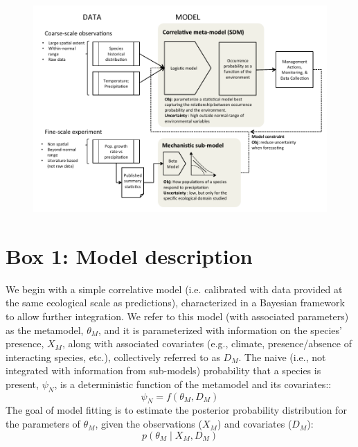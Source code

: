 \documentclass[11pt]{article}
\begin{document}
\newpage
\begin{figure}[h!]
	\includegraphics{management.pdf}
	\caption{}
	\label{fig:management}
\end{figure}


%
%


\newpage
\linenumbers
\section*{Box 1: Model description}
We begin with a simple correlative model (i.e. calibrated with data provided at the same ecological scale as predictions), characterized in a Bayesian framework to allow further integration. 
We refer to this model (with associated parameters) as the metamodel, \(\theta_M\), and it is parameterized with information on the species' presence, \(X_M\), along with associated covariates (e.g., climate, presence/absence of interacting species, etc.), collectively referred to as \(D_M\). 
The naive (i.e., not integrated with information from sub-models) probability that a species is present, \(\psi_N\), is a deterministic function of the metamodel and its covariates::
\begin{equation}
\label{eq:sdm1}
	\psi_N = f(\theta_M, D_M)
\end{equation}
The goal of model fitting is to estimate the posterior probability distribution for the parameters of \(\theta_M\), given the observations (\(X_M\)) and covariates (\(D_M\)):
\begin{equation}
\label{eq:sdm2}
	p( \theta_M \mid X_M, D_M)
\end{equation}
\end{document}
